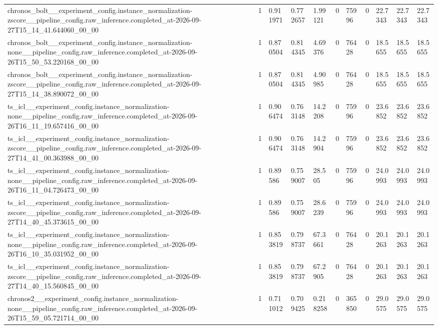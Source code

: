 \begin{tabular}{lllllllllll}
chronos\_bolt\_\_experiment\_config.instance\_normalization-zscore\_\_pipeline\_config.raw\_inference.completed\_at-2026-09-27T15\_14\_41.644060\_00\_00 & 1 & 0.911971 & 0.772657 & 1.99121 & 0 & 75996 & 0 & 22.7343 & 22.7343 & 22.7343 \\
chronos\_bolt\_\_experiment\_config.instance\_normalization-none\_\_pipeline\_config.raw\_inference.completed\_at-2026-09-26T15\_50\_53.220168\_00\_00 & 1 & 0.870504 & 0.814345 & 4.69376 & 0 & 76428 & 0 & 18.5655 & 18.5655 & 18.5655 \\
chronos\_bolt\_\_experiment\_config.instance\_normalization-zscore\_\_pipeline\_config.raw\_inference.completed\_at-2026-09-27T15\_14\_38.890072\_00\_00 & 1 & 0.870504 & 0.814345 & 4.90985 & 0 & 76428 & 0 & 18.5655 & 18.5655 & 18.5655 \\
ts\_icl\_\_experiment\_config.instance\_normalization-none\_\_pipeline\_config.raw\_inference.completed\_at-2026-09-26T16\_11\_19.657416\_00\_00 & 1 & 0.906474 & 0.763148 & 14.2208 & 0 & 75996 & 0 & 23.6852 & 23.6852 & 23.6852 \\
ts\_icl\_\_experiment\_config.instance\_normalization-zscore\_\_pipeline\_config.raw\_inference.completed\_at-2026-09-27T14\_41\_00.363988\_00\_00 & 1 & 0.906474 & 0.763148 & 14.2904 & 0 & 75996 & 0 & 23.6852 & 23.6852 & 23.6852 \\
ts\_icl\_\_experiment\_config.instance\_normalization-none\_\_pipeline\_config.raw\_inference.completed\_at-2026-09-26T16\_11\_04.726473\_00\_00 & 1 & 0.89586 & 0.759007 & 28.505 & 0 & 75996 & 0 & 24.0993 & 24.0993 & 24.0993 \\
ts\_icl\_\_experiment\_config.instance\_normalization-zscore\_\_pipeline\_config.raw\_inference.completed\_at-2026-09-27T14\_40\_45.373615\_00\_00 & 1 & 0.89586 & 0.759007 & 28.6239 & 0 & 75996 & 0 & 24.0993 & 24.0993 & 24.0993 \\
ts\_icl\_\_experiment\_config.instance\_normalization-none\_\_pipeline\_config.raw\_inference.completed\_at-2026-09-26T16\_10\_35.031952\_00\_00 & 1 & 0.853819 & 0.798737 & 67.3661 & 0 & 76428 & 0 & 20.1263 & 20.1263 & 20.1263 \\
ts\_icl\_\_experiment\_config.instance\_normalization-zscore\_\_pipeline\_config.raw\_inference.completed\_at-2026-09-27T14\_40\_15.560845\_00\_00 & 1 & 0.853819 & 0.798737 & 67.2905 & 0 & 76428 & 0 & 20.1263 & 20.1263 & 20.1263 \\
chronos2\_\_experiment\_config.instance\_normalization-none\_\_pipeline\_config.raw\_inference.completed\_at-2026-09-26T15\_59\_05.721714\_00\_00 & 1 & 0.711012 & 0.709425 & 0.218258 & 0 & 365850 & 0 & 29.0575 & 29.0575 & 29.0575 \\

\end{tabular}
